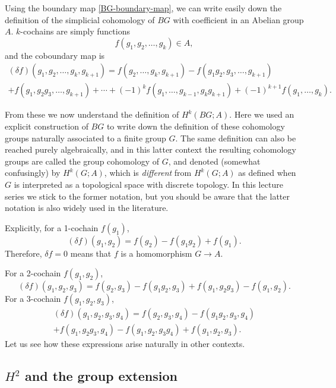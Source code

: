 \documentclass[12pt]{article}
\numberwithin{equation}{section}
\numberwithin{figure}{section}
\theoremstyle{remark}
\begin{document}
Using the boundary map \eqref{BG-boundary-map}, we can write easily down
the definition of the simplicial cohomology of $BG$ 
with coefficient in an Abelian group $A$.
$k$-cochains are simply functions \begin{equation}
f(g_1,g_2,\ldots,g_k)\in A,
\end{equation} and the coboundary map is \begin{multline}
(\delta f)(g_1,g_2,\ldots,g_k,g_{k+1}) = 
f(g_2,\ldots,g_k,g_{k+1}) - f(g_1g_2,g_3,\ldots,g_{k+1})  \\
+ f(g_1,g_2g_3,\ldots,g_{k+1}) +\cdots + 
(-1)^{k}f(g_1,\ldots,g_{k-1},g_{k}g_{k+1})
+ (-1)^{k+1} f(g_1,\ldots,g_k).
\end{multline}

From these we now understand the definition of $H^k(BG;A)$.
Here we used an explicit construction of $BG$ to write down
the definition of these cohomology groups naturally associated 
to a finite group $G$.
The same definition can also be reached purely algebraically,
and in this latter context the resulting cohomology groups are 
called the group cohomology of $G$, and denoted (somewhat confusingly)
by $H^k(G;A)$, which is \emph{different} from $H^k(G;A)$
as defined when $G$ is interpreted as a topological space 
with discrete topology.
In this lecture series we stick to the former notation,
but you should be aware that the latter notation is 
also widely used in the literature.

Explicitly, for a 1-cochain $f(g_1)$, \begin{equation}
(\delta f)(g_1,g_2)=f(g_2)-f(g_1g_2)+f(g_1).
\label{delta-1}
\end{equation} 
Therefore, $\delta f=0$ means that $f$ is a homomorphism $G\to A$.

For a 2-cochain $f(g_1,g_2)$, \begin{equation}
(\delta f)(g_1,g_2,g_3)=f(g_2,g_3)-f(g_1g_2,g_3)+f(g_1,g_2g_3)-f(g_1,g_2).
\label{delta-2}
\end{equation} 
For a 3-cochain $f(g_1,g_2,g_3)$, \begin{multline}
(\delta f)(g_1,g_2,g_3,g_4)=f(g_2,g_3,g_4)-f(g_1g_2,g_3,g_4)\\
+f(g_1,g_2g_3,g_4)-f(g_1,g_2,g_3g_4)+f(g_1,g_2,g_3).
\label{delta-3}
\end{multline}
Let us see how these expressions arise naturally in other contexts.

\subsection{$H^2$ and the group extension}
\end{document}
